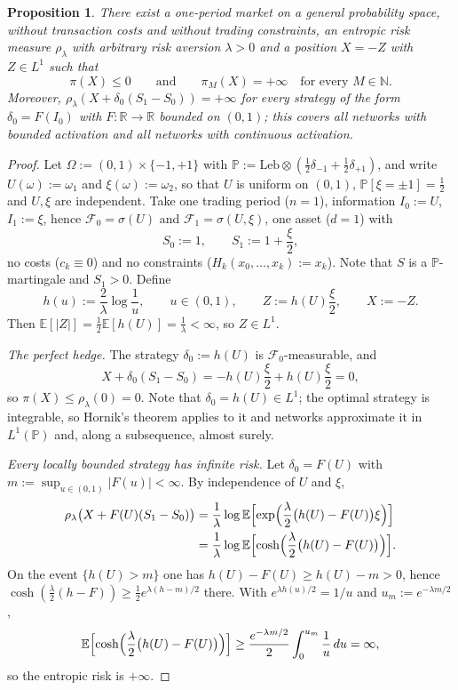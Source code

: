 \documentclass[11pt,a4paper]{report}
\numberwithin{equation}{chapter}
\theoremstyle{plain}
\newtheorem{proposition}{Proposition}[chapter]
\theoremstyle{definition}
\newcommand{\E}{\mathbb{E}}
\newcommand{\PP}{\mathbb{P}}
\newcommand{\R}{\mathbb{R}}
\newcommand{\N}{\mathbb{N}}
\newcommand{\F}{\mathcal{F}}
\begin{document}
\begin{proposition}\label{prop:counterexample}
    There exist a one-period market on a general probability space, without transaction costs and without trading constraints, an entropic risk measure $\rho_\lambda$ with arbitrary risk aversion $\lambda>0$ and a position $X=-Z$ with $Z\in L^1$ such that
    \[
        \pi(X)\le0\qquad\text{and}\qquad\pi_M(X)=+\infty\quad\text{for every }M\in\N.
    \]
    Moreover, $\rho_\lambda(X+\delta_0(S_1-S_0))=+\infty$ for \emph{every} strategy of the form $\delta_0=F(I_0)$ with $F\colon\R\to\R$ bounded on $(0,1)$; this covers all networks with bounded activation and all networks with continuous activation.
\end{proposition}

\begin{proof}
    Let $\Omega:=(0,1)\times\{-1,+1\}$ with $\PP:=\mathrm{Leb}\otimes(\frac{1}{2}\delta_{-1}+\frac{1}{2}\delta_{+1})$, and write $U(\omega):=\omega_1$ and $\xi(\omega):=\omega_2$, so that $U$ is uniform on $(0,1)$, $\PP[\xi=\pm1]=\frac{1}{2}$ and $U,\xi$ are independent. Take one trading period ($n=1$), information $I_0:=U$, $I_1:=\xi$, hence $\F_0=\sigma(U)$ and $\F_1=\sigma(U,\xi)$, one asset ($d=1$) with
    \[
        S_0:=1,\qquad S_1:=1+\frac{\xi}{2},
    \]
    no costs ($c_k\equiv0$) and no constraints ($H_k(x_0,\dots,x_k):=x_k$). Note that $S$ is a $\PP$-martingale and $S_1>0$. Define
    \[
        h(u):=\frac{2}{\lambda}\log\frac{1}{u},\qquad u\in(0,1),\qquad
        Z:=h(U)\frac{\xi}{2},\qquad X:=-Z.
    \]
    Then $\E[|Z|]=\frac{1}{2}\E[h(U)]=\frac{1}{\lambda}<\infty$, so $Z\in L^1$.

    \emph{The perfect hedge.} The strategy $\delta_0:=h(U)$ is $\F_0$-measurable, and
    \[
        X+\delta_0(S_1-S_0)=-h(U)\frac{\xi}{2}+h(U)\frac{\xi}{2}=0,
    \]
    so $\pi(X)\le\rho_\lambda(0)=0$. Note that $\delta_0=h(U)\in L^1$; the optimal strategy is integrable, so Hornik's theorem applies to it and networks approximate it in $L^1(\PP)$ and, along a subsequence, almost surely.

    \emph{Every locally bounded strategy has infinite risk.} Let $\delta_0=F(U)$ with $m:=\sup_{u\in(0,1)}|F(u)|<\infty$. By independence of $U$ and $\xi$,
    \begin{align*}
        \rho_\lambda\bigl(X+F(U)(S_1-S_0)\bigr)
         & =\frac{1}{\lambda}\log\E\Bigl[\exp\Bigl(\frac{\lambda}{2}\bigl(h(U)-F(U)\bigr)\xi\Bigr)\Bigr] \\
         & =\frac{1}{\lambda}\log\E\Bigl[\cosh\Bigl(\frac{\lambda}{2}\bigl(h(U)-F(U)\bigr)\Bigr)\Bigr].
    \end{align*}
    On the event $\{h(U)>m\}$ one has $h(U)-F(U)\ge h(U)-m>0$, hence $\cosh(\frac{\lambda}{2}(h-F))\ge\frac{1}{2}e^{\lambda(h-m)/2}$ there. With $e^{\lambda h(u)/2}=1/u$ and $u_m:=e^{-\lambda m/2}$,
    \[
        \E\Bigl[\cosh\Bigl(\frac{\lambda}{2}\bigl(h(U)-F(U)\bigr)\Bigr)\Bigr]
        \ge\frac{e^{-\lambda m/2}}{2}\int_0^{u_m}\frac{1}{u}\,du=\infty,
    \]
    so the entropic risk is $+\infty$.


\end{proof}
\end{document}
